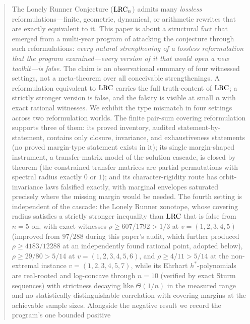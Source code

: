 
\begin{abstract}
\noindent
The Lonely Runner Conjecture ($\lrc_n$) admits many \emph{lossless}
reformulations---finite, geometric, dynamical, or arithmetic rewrites that
are exactly equivalent to it. This paper is about a structural fact that
emerged from a multi-year program of attacking the conjecture through such
reformulations: \emph{every natural strengthening of a lossless
reformulation that the program examined---every version of it that would
open a new toolkit---is false}. The claim is an observational summary of
four witnessed settings, not a meta-theorem over all conceivable
strengthenings. A reformulation equivalent to $\lrc$ carries the full
truth-content of $\lrc$; a strictly stronger version is false, and the
falsity is visible at small $n$ with exact rational witnesses. We exhibit
the type mismatch in four settings across two reformulation worlds. The
finite pair-sum covering reformulation supports three of them: its proved
inventory, audited statement-by-statement, contains only closure,
invariance, and exhaustiveness statements (no proved margin-type statement
exists in it); its single margin-shaped instrument, a transfer-matrix
model of the solution cascade, is closed by theorem (the constrained
transfer matrices are partial permutations with spectral radius exactly
$0$ or $1$); and its character-rigidity route has orbit-invariance laws
falsified exactly, with marginal envelopes saturated precisely where the
missing margin would be needed. The fourth setting is independent of the
cascade: the Lonely Runner zonotope, whose covering radius satisfies a
strictly stronger inequality than $\lrc$ that is false from $n=5$ on,
with exact witnesses $\rho \ge 607/1792 > 1/3$ at $v=(1,2,3,4,5)$
(improved from $97/288$ during this paper's audit, which further produced
$\rho \ge 4183/12288$ at an independently found rational point, adopted
below), $\rho \ge 29/80 > 5/14$ at $v=(1,2,3,4,5,6)$, and $\rho \ge
4/11 > 5/14$ at the non-extremal instance $v=(1,2,3,4,5,7)$, while its
Ehrhart $h^*$-polynomials are real-rooted and log-concave through
$n=10$ (verified by exact Sturm sequences) with strictness decaying like
$\Theta(1/n)$ in the measured range and no statistically distinguishable
correlation with covering margins at the achievable sample sizes.
Alongside the negative result we record the program's one bounded positive

\end{abstract}
